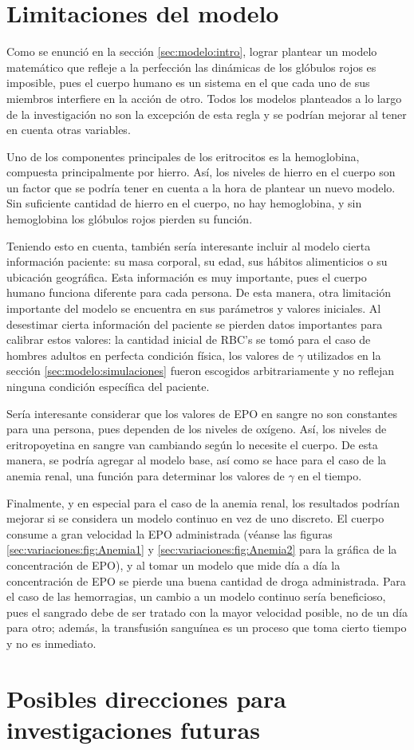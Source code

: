 \section{Limitaciones del modelo}

Como se enunció en la sección \ref{sec:modelo:intro}, lograr plantear un modelo matemático que refleje a la perfección las dinámicas de los glóbulos rojos es imposible, pues el cuerpo humano es un sistema en el que cada uno de sus miembros interfiere en la acción de otro. Todos los modelos planteados a lo largo de la investigación no son la excepción de esta regla y se podrían mejorar al tener en cuenta otras variables.

Uno de los componentes principales de los eritrocitos es la hemoglobina, compuesta principalmente por hierro. Así, los niveles de hierro en el cuerpo son un factor que se podría tener en cuenta a la hora de plantear un nuevo modelo. Sin suficiente cantidad de hierro en el cuerpo, no hay hemoglobina, y sin hemoglobina los glóbulos rojos pierden su función.

Teniendo esto en cuenta, también sería interesante incluir al modelo cierta información paciente: su masa corporal, su edad, sus hábitos alimenticios o su ubicación geográfica. Esta información es muy importante, pues el cuerpo humano funciona diferente para cada persona. De esta manera, otra limitación importante del modelo se encuentra en sus parámetros y valores iniciales. Al desestimar cierta información del paciente se pierden datos importantes para calibrar estos valores: la cantidad inicial de RBC's se tomó para el caso de hombres adultos en perfecta condición física, los valores de $\gamma$ utilizados en la sección \ref{sec:modelo:simulaciones} fueron escogidos arbitrariamente y no reflejan ninguna condición específica del paciente. 

Sería interesante considerar que los valores de EPO en sangre no son constantes para una persona, pues dependen de los niveles de oxígeno. Así, los niveles de eritropoyetina en sangre van cambiando según lo necesite el cuerpo. De esta manera, se podría agregar al modelo base, así como se hace para el caso de la anemia renal, una función para determinar los valores de $\gamma$ en el tiempo.

Finalmente, y en especial para el caso de la anemia renal, los resultados podrían mejorar si se considera un modelo continuo en vez de uno discreto. El cuerpo consume a gran velocidad la EPO administrada (véanse las figuras \ref{sec:variaciones:fig:Anemia1} y \ref{sec:variaciones:fig:Anemia2} para la gráfica de la concentración de EPO), y al tomar un modelo que mide día a día la concentración de EPO se pierde una buena cantidad de droga administrada. Para el caso de las hemorragias, un cambio a un modelo continuo sería beneficioso, pues el sangrado debe de ser tratado con la mayor velocidad posible, no de un día para otro; además, la transfusión sanguínea es un proceso que toma cierto tiempo y no es inmediato. 

\section{Posibles direcciones para investigaciones futuras}

